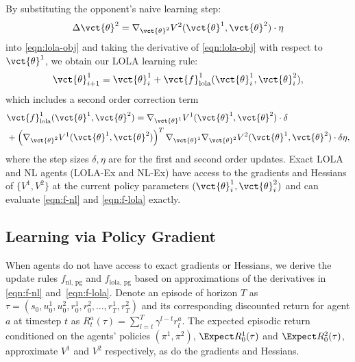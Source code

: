 By substituting the opponent's naive learning step:
\begin{equation} \label{eqn:opponent-naive}
    \Delta \vct{\theta}^2 = \nabla_{\vct{\theta}^2} V^2(\vct{\theta}^1, \vct{\theta}^2) \cdot \eta
\end{equation}
into \eqref{eqn:lola-obj} and taking the derivative of \eqref{eqn:lola-obj} with respect to $\vct{\theta}^1$, we obtain our LOLA learning rule:
\begin{equation*}
\vct{\theta}^1_{i+1} = \vct{\theta}^1_{i}  + \vct{f}^1_{\text{lola}}(\vct{\theta}^1_{i}, \vct{\theta}^2_{i}),
\end{equation*}
 which includes a second order correction term
\begin{align}
&\vct{f}^1_{\text{lola}}(\vct{\theta}^1, \vct{\theta}^2) = \nabla_{\vct{\theta}^1} V^1(\vct{\theta}^1, \vct{\theta}^2)  \cdot \delta \nonumber \\
 & + \left(\nabla_{\vct{\theta}^2} V^1(\vct{\theta}^1, \vct{\theta}^2) \right)^T  
  \nabla_{\vct{\theta}^1} \nabla_{\vct{\theta}^2} V^2(\vct{\theta}^1, \vct{\theta}^2)  \cdot \delta  \eta, \label{eqn:f-lola}
\end{align}
where the step sizes $\delta, \eta$ are for the first and second order updates. 
Exact LOLA and NL agents (LOLA-Ex and NL-Ex) have access to the gradients and Hessians of $\{V^1, V^2\}$ at the current policy parameters $(\vct{\theta}^1_i, \vct{\theta}^2_i)$ and can evaluate \eqref{eqn:f-nl} and \eqref{eqn:f-lola} exactly.


\subsection{Learning via Policy Gradient} \label{sec:pg}
When agents do not have access to exact gradients or Hessians, we derive the update rules $f_{\text{nl, pg}}$ and $f_{\text{lola, pg}}$ based on approximations of the derivatives in \eqref{eqn:f-nl} and~\eqref{eqn:f-lola}. 
Denote an episode of horizon $T$ as $\tau = (s_0, u^1_0, u^2_0, r^1_0, r^2_0, ..., r^1_{T}, r^2_{T})$ and its corresponding discounted return for agent $a$ at timestep $t$ as
$R^a_t(\tau) = \sum\nolimits_{l=t}^{T} \gamma^{l-t} r^a_{l}$. 
The expected episodic return conditioned on the agents' policies $(\pi^1, \pi^2)$, $\Expect R^1_0(\tau)$ and $\Expect R^2_0(\tau)$, approximate $V^1$ and $V^2$ respectively, as do the gradients and Hessians. 

